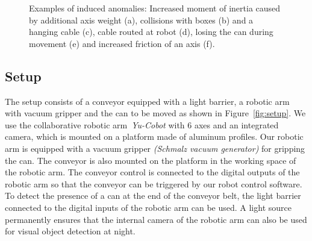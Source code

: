 \documentclass[journal]{IEEEtran}
\newcommand\anoImgWidth{0.16}
\newcommand\imgSpaceBetween{0.1mm}
\begin{document}
\begin{figure*}[b]
  \centering
  
  \hspace{\imgSpaceBetween}
  \hspace{\imgSpaceBetween}
  \hspace{\imgSpaceBetween}
  \hspace{\imgSpaceBetween}
  \hspace{\imgSpaceBetween}  
  \hspace{\imgSpaceBetween}  

  \caption{Examples of induced anomalies: Increased moment of inertia caused by additional axis weight (a), collisions with boxes (b) and a hanging cable (c), cable routed at robot (d), losing the can during movement (e) and increased friction of an axis (f).}
  \label{fig:ano_examples}
    \vspace{-2mm}
\end{figure*}

\subsection{Setup}
The setup consists of a conveyor equipped with a light barrier, a robotic arm with vacuum gripper and the can to be moved as shown in Figure~\ref{fig:setup}.
We use the collaborative robotic arm~\textit{Yu-Cobot} with 6 axes {and an integrated camera}, which is mounted on a platform made of aluminum profiles.
Our robotic arm is equipped with a vacuum gripper {\textit{(Schmalz vacuum generator)}} for gripping the can.
The conveyor is also mounted on the platform in the working space of the robotic arm.
The conveyor control is connected to the digital outputs of the robotic arm so that the conveyor can be triggered by our robot control software.
To detect the presence of a can at the end of the conveyor belt, the light barrier connected to the digital inputs of the robotic arm can be used.
A light source permanently ensures that the internal camera of the robotic arm can also be used for visual object detection at night.
\end{document}
